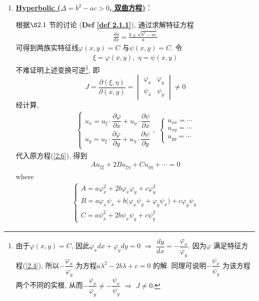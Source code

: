 	\begin{enumerate}
		\item \textbf{\underline{Hyperbolic ($\Delta = b^2 - ac > 0$, 双曲方程)}}：
		
		\vspace*{1em}
		
		根据$\S 2.1$ 节的讨论 (\textbf{Def \ref{def 2.1.1}}), 通过求解特征方程
		\begin{align*}
			\frac{dy}{dx} = \frac{b \pm \sqrt{b^2 - ac}}{a}
		\end{align*}
		可得到两族实特征线$\varphi(x , y) = C$ 与$\psi(x , y) = C$. 令
		\begin{align}
			\xi = \varphi(x , y) , \,\, \eta = \psi(x , y) \label{2.8}
		\end{align}
		不难证明上述变换可逆\footnote{由于$\varphi(x , y) = C$, 因此$\varphi_x dx + \varphi_y dy = 0 \,\, \Rightarrow \,\, \dfrac{dy}{dx} = -\dfrac{\varphi_x}{\varphi_y}$. 因为$\varphi$ 满足特征方程(\ref{2.4}), 所以$-\dfrac{\varphi_x}{\varphi_y}$ 为方程$a \lambda^2 - 2b \lambda + c = 0$ 的解. 同理可说明$-\dfrac{\psi_x}{\psi_y}$ 为该方程两个不同的实根, 从而$-\dfrac{\varphi_x}{\varphi_y} \neq -\dfrac{\psi_x}{\psi_y} \,\, \Rightarrow \,\, J \neq 0$.}, 即
		\[ 
		J = \frac{\partial(\xi , \eta)}{\partial (x , y)} = 
		\begin{vmatrix}
			\varphi_x &\varphi_y \\
			\psi_x &\psi_y
		\end{vmatrix} \neq 0 
		\]
		经计算, 
		\begin{align*}
			\begin{cases}
				u_x = u_{\xi} \cdot \dfrac{\partial \varphi}{\partial x} + u_{\eta} \cdot \dfrac{\partial \psi}{\partial x} \\
				u_y = u_{\xi} \cdot \dfrac{\partial \varphi}{\partial y} + u_{\eta} \cdot \dfrac{\partial \psi}{\partial y}
			\end{cases} , \,\, 
			\begin{cases}
				u_{xx} = \cdots \\
				u_{xy} = \cdots \\
				u_{yy} = \cdots
			\end{cases}
		\end{align*}
		代入原方程(\ref{2.6}), 得到
		\begin{align}
			Au_{\xi\xi} + 2Bu_{\xi\eta} + Cu_{\eta\eta} + \cdots = 0 \label{2.9}
		\end{align}
		where 
		\begin{align*}
			\begin{cases}
				A = a \varphi_{x}^2 + 2b \varphi_x \varphi_y + c\varphi_{y}^2 \\
				B = a \varphi_x \psi_x + b \Big( \varphi_x \psi_y + \varphi_y \psi_x \Big) + c \varphi_y \psi_y \\
				C = a \psi_{x}^2 + 2b \psi_x \psi_y + c\psi_{y}^2
			\end{cases}
		\end{align*}
		

\end{enumerate}
